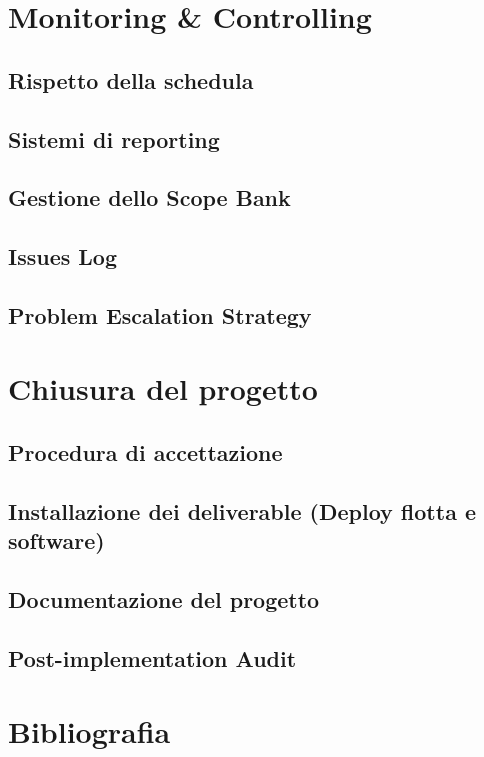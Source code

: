 \documentclass[12pt, a4paper]{article}
\begin{document}
\section{Monitoring \& Controlling}
\subsection{Rispetto della schedula}
\subsection{Sistemi di reporting}
\subsection{Gestione dello Scope Bank}
\subsection{Issues Log}
\subsection{Problem Escalation Strategy}

\section{Chiusura del progetto}
\subsection{Procedura di accettazione}
\subsection{Installazione dei deliverable (Deploy flotta e software)}
\subsection{Documentazione del progetto}
\subsection{Post-implementation Audit}

\section{Bibliografia}
\end{document}
